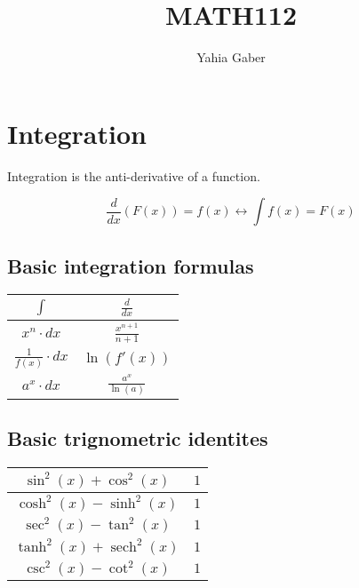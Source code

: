 \documentclass[a4paper]{book}
\author{Yahia Gaber}
\title{MATH112}
\begin{document}
\maketitle
\tableofcontents

\chapter{Integration}

Integration is the anti-derivative of a function.

\[\frac{d}{dx}(F(x)) = f(x) \leftrightarrow \int f(x) = F(x)\]

\section{Basic integration formulas}

\begin{center}

  \begin{tabular}{|c|c|}

    \hline
    $\displaystyle{\int}$ & $\displaystyle{\frac{d}{dx}}$ \\ \hline \hline
    $\displaystyle{x^n \cdot dx}$ & $\displaystyle{\frac{x^{n + 1}}{n + 1}}$ \\ \hline
    $\displaystyle{\frac{1}{f(x)} \cdot dx}$ & $\displaystyle{\ln(f'(x))}$ \\ \hline
    $\displaystyle{a^x \cdot dx}$ & $\displaystyle{\frac{a^x}{\ln(a)}}$ \\
    \hline

  \end{tabular}

\end{center}

\section{Basic trignometric identites}

\begin{center}

  \begin{tabular}{|c|c|}

    \hline
    $\displaystyle{\sin^2(x) + \cos^2(x)}$ & $\displaystyle{1}$ \\ \hline \hline
    $\displaystyle{\cosh^2(x) - \sinh^2(x)}$ & $\displaystyle{1}$ \\ \hline \hline
    $\displaystyle{\sec^2(x) - \tan^2(x)}$ & $\displaystyle{1}$ \\ \hline \hline
    $\displaystyle{\tanh^2(x) + \operatorname{sech}^2(x)}$ & $\displaystyle{1}$ \\ \hline \hline
    $\displaystyle{\csc^2(x) - \cot^2(x)}$ & $\displaystyle{1}$ \\ \hline \hline
    \hline

  \end{tabular}

\end{center}
\end{document}
